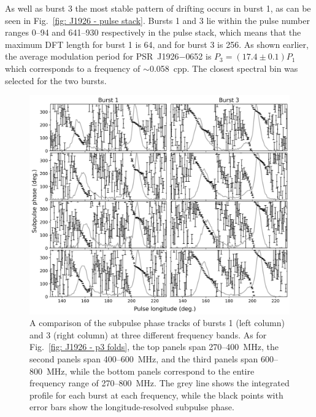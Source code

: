 
As well as burst 3 the most stable pattern of drifting occurs in burst 1, as can be seen in Fig.~\ref{fig: J1926 - pulse stack}. Bursts 1 and 3 lie within the pulse number ranges 0--94 and 641--930 respectively in the pulse stack, which means that the maximum DFT length for burst 1 is 64, and for burst 3 is 256. As shown earlier, the average modulation period for PSR~J1926$-$0652 is $P_3 = (17.4 \pm 0.1)P_1$ which corresponds to a frequency of $\sim$0.058~cpp. The closest spectral bin was selected for the two bursts.

\begin{figure}
    \begin{center}
        \includegraphics[width=1.0\textwidth]{Figures/J1926/subpulse_phase}
        \caption[Subpulse phase tracks of PSR~J1926$-$0652]{A comparison of the subpulse phase tracks of bursts 1 (left column) and 3 (right column) at three different frequency bands. As for Fig.~\ref{fig: J1926 - p3 folds}, the top panels span 270--400~MHz, the second panels span 400--600~MHz, and the third panels span 600--800~MHz, while the bottom panels correspond to the entire frequency range of 270--800~MHz. The grey line shows the integrated profile for each burst at each frequency, while the black points with error bars show the longitude-resolved subpulse phase.}
        \label{fig: J1926 - phase tracks}
    \end{center}
\end{figure}

